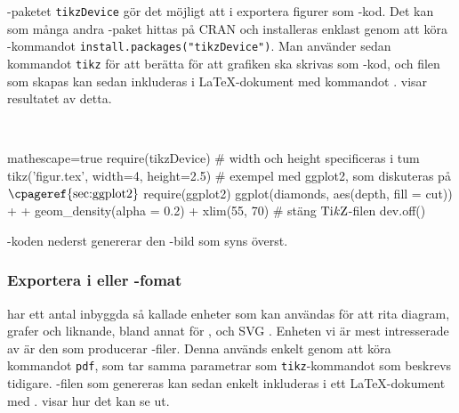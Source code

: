 \documentclass[lang=sv,ptsize=10pt,font=none,nomath,titles=bf,../../a4.tex]{subfiles}
\begin{document}
\Rlogo-paketet \texttt{tikzDevice} \parencite{Sharpsteen12} gör det möjligt
att i \Rlogo exportera figurer som \PGFTikZ-kod. Det kan som många andra
\Rlogo-paket hittas på CRAN och installeras enklast genom att köra
\Rlogo-kommandot \verb|install.packages("tikzDevice")|. Man använder
sedan kommandot \texttt{tikz} för att berätta för \Rlogo att grafiken
ska skrivas som \PGFTikZ-kod, och filen som skapas kan sedan inkluderas
i \LaTeX-dokument med kommandot .
 visar resultatet av detta.

\begin{kod}[tbp]
	\centering
	\begin{minipage}{\textwidth}
		\centering
		
	\end{minipage}
	\\[1ex]
	\begin{minipage}{\textwidth}
		\begin{rcode*}{mathescape=true}
require(tikzDevice)
# width och height specificeras i tum
tikz('figur.tex', width=4, height=2.5)
# exempel med ggplot2, som diskuteras på $\text{\cpageref{sec:ggplot2}}$
require(ggplot2)
ggplot(diamonds, aes(depth, fill = cut)) +
  + geom_density(alpha = 0.2) + xlim(55, 70)
# stäng $\text{Ti\textit{k}Z}$-filen
dev.off()
		\end{rcode*}
	\end{minipage}
	\caption{\Rlogo-koden nederst genererar den \PGFTikZ-bild som
	syns överst.}
	\label{ex:tikzdevice}
\end{kod}


\subsubsection{Exportera i \PDF eller \PNG-fomat}

\Rlogo har ett antal inbyggda så kallade enheter  som kan
användas för att rita diagram, grafer och liknande, bland annat för \EPS,
\PNG och \textsc{SVG} \parencite[s.~713]{RCoreTeam12}. Enheten vi är mest
intresserade av är den som producerar \PDF-filer. Denna används enkelt
genom att köra kommandot \texttt{pdf}, som tar samma parametrar som
\texttt{tikz}-kommandot som beskrevs tidigare. \PDF-filen som genereras
kan sedan enkelt inkluderas i ett \LaTeX-dokument med .
 visar hur det kan se ut.
\end{document}
